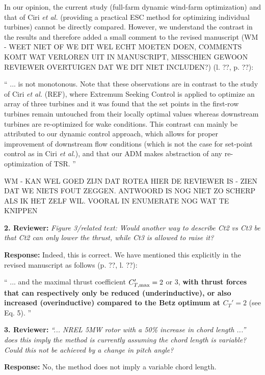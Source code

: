 \documentclass[]{article}
\begin{document}
In our opinion, the current study (full-farm dynamic wind-farm optimization) and that of Ciri \emph{et al.} (providing a practical ESC method for optimizing individual turbines) cannot be directly compared. However, we understand the contrast in the results and therefore added a small comment to the revised manuscript (WM - WEET NIET OF WE DIT WEL ECHT MOETEN DOEN, COMMENTS KOMT WAT VERLOREN UIT IN MANUSCRIPT, MISSCHIEN GEWOON REVIEWER OVERTUIGEN DAT WE DIT NIET INCLUDEN?) (l. ??, p. ??):

``
... is not monotonous. Note that these observations are in contrast to the study of Ciri \emph{et al.} (REF), where Extremum Seeking Control is applied to optimize an array of three turbines and it was found that the set points in the first-row turbines remain untouched from their locally optimal values whereas downstream turbines are re-optimized for wake conditions. This contrast can mainly be attributed to our dynamic control approach, which allows for proper improvement of downstream flow conditions (which is not the case for set-point control as in Ciri \emph{et al.}), and that our ADM makes abstraction of any re-optimization of TSR.
''

WM - KAN WEL GOED ZIJN DAT ROTEA HIER DE REVIEWER IS - ZIEN DAT WE NIETS FOUT ZEGGEN. ANTWOORD IS NOG NIET ZO SCHERP ALS IK HET ZELF WIL. VOORAL IN ENUMERATE NOG WAT TE KNIPPEN

\dotfill

\textbf{2. Reviewer:} \textit{Figure 3/related text: Would another way to describe Ct2 vs Ct3 be that Ct2 can only lower the thrust, while Ct3 is allowed to raise it?}

\textbf{Response:} Indeed, this is correct. We have mentioned this explicitly in the revised manuscript as follows (p. ??, l. ??):

``
... and the maximal thrust coefficient $C_{T,\rm max}' = 2$ or 3, \textbf{with thrust forces that can respectively only be reduced (underinductive), or also increased (overinductive) compared to the Betz optimum at $C_T' = 2$} (see Eq. 5). 
''

\dotfill

\textbf{3. Reviewer:} \textit{``... NREL 5MW rotor with a 50\% increase in chord length ...'' does this imply the method is currently assuming the chord length is variable? Could this not be achieved by a change in pitch angle?}

\textbf{Response:} No, the method does not imply a variable chord length. 
\end{document}
